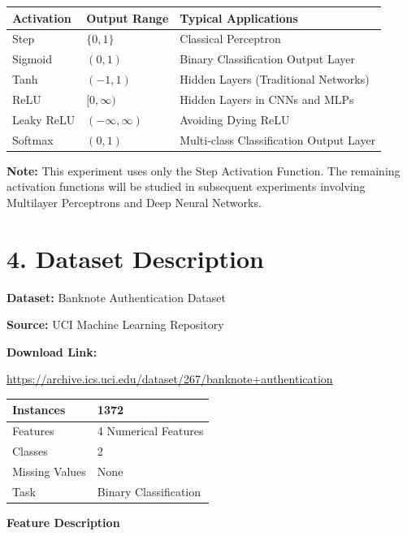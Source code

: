 \documentclass[11pt]{article}
\begin{document}
\begin{center}
\begin{tabular}{|p{2.5cm}|p{3cm}|p{6cm}|}
\hline
\textbf{Activation} & \textbf{Output Range} & \textbf{Typical Applications}\\
\hline
Step & $\{0,1\}$ & Classical Perceptron\\
\hline
Sigmoid & $(0,1)$ & Binary Classification Output Layer\\
\hline
Tanh & $(-1,1)$ & Hidden Layers (Traditional Networks)\\
\hline
ReLU & $[0,\infty)$ & Hidden Layers in CNNs and MLPs\\
\hline
Leaky ReLU & $(-\infty,\infty)$ & Avoiding Dying ReLU\\
\hline
Softmax & $(0,1)$ & Multi-class Classification Output Layer\\
\hline
\end{tabular}
\end{center}

\textbf{Note:} This experiment uses only the Step Activation Function. The remaining activation functions will be studied in subsequent experiments involving Multilayer Perceptrons and Deep Neural Networks.


\section*{4. Dataset Description}

\textbf{Dataset:} Banknote Authentication Dataset

\textbf{Source:} UCI Machine Learning Repository

\textbf{Download Link:}

\url{https://archive.ics.uci.edu/dataset/267/banknote+authentication}

\begin{center}
\begin{tabular}{|l|l|}
\hline
Instances & 1372\\
\hline
Features & 4 Numerical Features\\
\hline
Classes & 2\\
\hline
Missing Values & None\\
\hline
Task & Binary Classification\\
\hline
\end{tabular}
\end{center}

\textbf{Feature Description}
\end{document}
